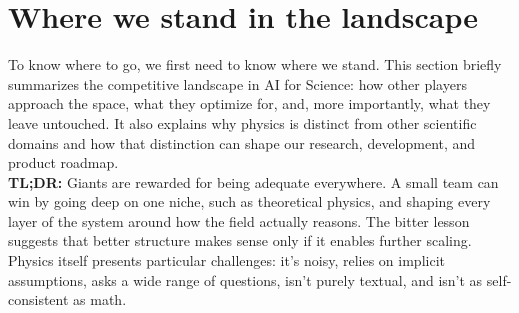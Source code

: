 \section{Where we stand in the landscape}
\label{section:start}

\begin{summarybox}
To know where to go, we first need to know where we stand. This section briefly summarizes the competitive landscape in AI for Science: how other players approach the space, what they optimize for, and, more importantly, what they leave untouched. It also explains why physics is distinct from other scientific domains and how that distinction can shape our research, development, and product roadmap.\\[6pt]
\textbf{TL;DR:} Giants are rewarded for being adequate everywhere. A small team can win by going deep on one niche, such as theoretical physics, and shaping every layer of the system around how the field actually reasons. The bitter lesson suggests that better structure makes sense only if it enables further scaling. Physics itself presents particular challenges: it's noisy, relies on implicit assumptions, asks a wide range of questions, isn't purely textual, and isn't as self-consistent as math.
\end{summarybox}

